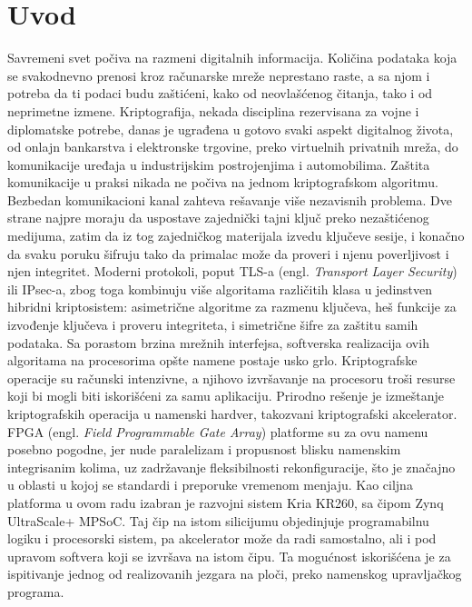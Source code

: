 \chapter{Uvod}
\label{ch:uvod}

Savremeni svet počiva na razmeni digitalnih informacija. Količina podataka koja se svakodnevno prenosi kroz računarske mreže neprestano raste, a sa njom i potreba da ti podaci budu zaštićeni, kako od neovlašćenog čitanja, tako i od neprimetne izmene. Kriptografija, nekada disciplina rezervisana za vojne i diplomatske potrebe, danas je ugrađena u gotovo svaki aspekt digitalnog života, od onlajn bankarstva i elektronske trgovine, preko virtuelnih privatnih mreža, do komunikacije uređaja u industrijskim postrojenjima i automobilima.
\smallbreak
Zaštita komunikacije u praksi nikada ne počiva na jednom kriptografskom algoritmu. Bezbedan komunikacioni kanal zahteva rešavanje više nezavisnih problema. Dve strane najpre moraju da uspostave zajednički tajni ključ preko nezaštićenog medijuma, zatim da iz tog zajedničkog materijala izvedu ključeve sesije, i konačno da svaku poruku šifruju tako da primalac može da proveri i njenu poverljivost i njen integritet. Moderni protokoli, poput TLS-a (engl. \textit{Transport Layer Security}) ili IPsec-a, zbog toga kombinuju više algoritama različitih klasa u jedinstven hibridni kriptosistem: asimetrične algoritme za razmenu ključeva, heš funkcije za izvođenje ključeva i proveru integriteta, i simetrične šifre za zaštitu samih podataka.
\smallbreak
Sa porastom brzina mrežnih interfejsa, softverska realizacija ovih algoritama na procesorima opšte namene postaje usko grlo. Kriptografske operacije su računski intenzivne, a njihovo izvršavanje na procesoru troši resurse koji bi mogli biti iskorišćeni za samu aplikaciju. Prirodno rešenje je izmeštanje kriptografskih operacija u namenski hardver, takozvani kriptografski akcelerator. FPGA (engl. \textit{Field Programmable Gate Array}) platforme su za ovu namenu posebno pogodne, jer nude paralelizam i propusnost blisku namenskim integrisanim kolima, uz zadržavanje fleksibilnosti rekonfiguracije, što je značajno u oblasti u kojoj se standardi i preporuke vremenom menjaju. Kao ciljna platforma u ovom radu izabran je razvojni sistem Kria KR260, sa čipom Zynq UltraScale+ MPSoC. Taj čip na istom silicijumu objedinjuje programabilnu logiku i procesorski sistem, pa akcelerator može da radi samostalno, ali i pod upravom softvera koji se izvršava na istom čipu. Ta mogućnost iskorišćena je za ispitivanje jednog od realizovanih jezgara na ploči, preko namenskog upravljačkog programa.
